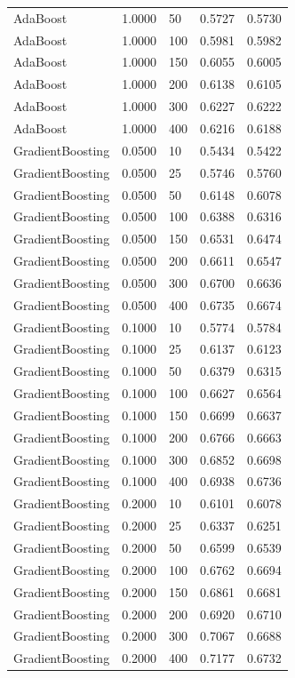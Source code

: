 \begin{table}[htbp]
{\begin{tabular}{lllll}
AdaBoost & 1.0000 & 50 & 0.5727 & 0.5730 \\
AdaBoost & 1.0000 & 100 & 0.5981 & 0.5982 \\
AdaBoost & 1.0000 & 150 & 0.6055 & 0.6005 \\
AdaBoost & 1.0000 & 200 & 0.6138 & 0.6105 \\
AdaBoost & 1.0000 & 300 & 0.6227 & 0.6222 \\
AdaBoost & 1.0000 & 400 & 0.6216 & 0.6188 \\
GradientBoosting & 0.0500 & 10 & 0.5434 & 0.5422 \\
GradientBoosting & 0.0500 & 25 & 0.5746 & 0.5760 \\
GradientBoosting & 0.0500 & 50 & 0.6148 & 0.6078 \\
GradientBoosting & 0.0500 & 100 & 0.6388 & 0.6316 \\
GradientBoosting & 0.0500 & 150 & 0.6531 & 0.6474 \\
GradientBoosting & 0.0500 & 200 & 0.6611 & 0.6547 \\
GradientBoosting & 0.0500 & 300 & 0.6700 & 0.6636 \\
GradientBoosting & 0.0500 & 400 & 0.6735 & 0.6674 \\
GradientBoosting & 0.1000 & 10 & 0.5774 & 0.5784 \\
GradientBoosting & 0.1000 & 25 & 0.6137 & 0.6123 \\
GradientBoosting & 0.1000 & 50 & 0.6379 & 0.6315 \\
GradientBoosting & 0.1000 & 100 & 0.6627 & 0.6564 \\
GradientBoosting & 0.1000 & 150 & 0.6699 & 0.6637 \\
GradientBoosting & 0.1000 & 200 & 0.6766 & 0.6663 \\
GradientBoosting & 0.1000 & 300 & 0.6852 & 0.6698 \\
GradientBoosting & 0.1000 & 400 & 0.6938 & 0.6736 \\
GradientBoosting & 0.2000 & 10 & 0.6101 & 0.6078 \\
GradientBoosting & 0.2000 & 25 & 0.6337 & 0.6251 \\
GradientBoosting & 0.2000 & 50 & 0.6599 & 0.6539 \\
GradientBoosting & 0.2000 & 100 & 0.6762 & 0.6694 \\
GradientBoosting & 0.2000 & 150 & 0.6861 & 0.6681 \\
GradientBoosting & 0.2000 & 200 & 0.6920 & 0.6710 \\
GradientBoosting & 0.2000 & 300 & 0.7067 & 0.6688 \\
GradientBoosting & 0.2000 & 400 & 0.7177 & 0.6732 \\
\bottomrule
\end{tabular}
}
\end{table}
